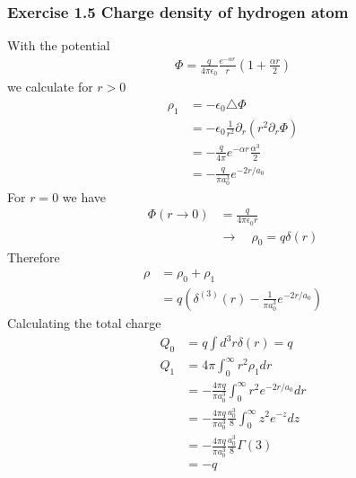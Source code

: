 \documentclass[10pt,a4paper]{article}
\theoremstyle{definition}
\begin{document}
\subsubsection{Exercise 1.5 Charge density of hydrogen atom}
With the potential
\begin{align}
\Phi=\frac{q}{4\pi\epsilon_0}\frac{e^{-\alpha r}}{r}\left(1+\frac{\alpha r}{2}\right)
\end{align}
we calculate for $r>0$
\begin{align}
\rho_1
&=-\epsilon_0\triangle\Phi\\
&=-\epsilon_0\frac{1}{r^2}\partial_r(r^2\partial_r\Phi)\\
&=-\frac{q}{4\pi}e^{-\alpha r}\frac{\alpha^3}{2}\\
&=-\frac{q}{\pi a_0^3}e^{-2r/a_0}
\end{align}
For $r=0$ we have
\begin{align}
\Phi(r\rightarrow0)&=\frac{q}{4\pi\epsilon_0r}\\
&\rightarrow\quad \rho_0=q\delta(r)
\end{align}
Therefore
\begin{align}
\rho&=\rho_0+\rho_1\\
&=q\left(\delta^{(3)}(r)-\frac{1}{\pi a_0^3}e^{-2r/a_0}\right)
\end{align}
Calculating the total charge
\begin{align}
Q_0&=q\int d^3r\delta(r)=q\\
Q_1
&=4\pi\int_0^\infty r^2\rho_1 dr\\
&=-\frac{4\pi q}{\pi a_0^3}\int_0^\infty r^2e^{-2r/a_0}dr\\
&=-\frac{4\pi q}{\pi a_0^3}\frac{a_0^3}{8}\int_0^\infty z^2e^{-z}dz\\
&=-\frac{4\pi q}{\pi a_0^3}\frac{a_0^3}{8}\Gamma(3)\\
&=-q
\end{align}
\end{document}
